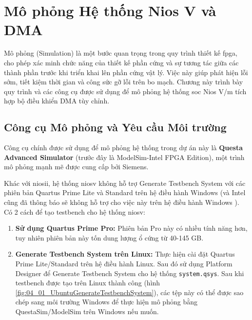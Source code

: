 \chapter{Mô phỏng Hệ thống Nios V và DMA}
\label{Chapter4}

Mô phỏng (Simulation) là một bước quan trọng trong quy trình thiết kế \acrshort{fpga}, cho phép xác minh chức năng của thiết kế phần cứng và sự tương tác giữa các thành phần trước khi triển khai lên phần cứng vật lý. Việc này giúp phát hiện lỗi sớm, tiết kiệm thời gian và công sức gỡ lỗi trên bo mạch. Chương này trình bày quy trình và các công cụ được sử dụng để mô phỏng hệ thống \acrshort{soc} Nios V/m tích hợp bộ điều khiển DMA tùy chỉnh.

\section{Công cụ Mô phỏng và Yêu cầu Môi trường}

Công cụ chính được sử dụng để mô phỏng hệ thống trong dự án này là \textbf{Questa Advanced Simulator} (trước đây là ModelSim-Intel FPGA Edition), một trình mô phỏng mạnh mẽ được cung cấp bởi Siemens.

Khác với \acrshort{niosii}, hệ thống \acrshort{niosv} không hỗ trợ Generate Testbench System với các phiên bản Quartus Prime Lite và Standard trên hệ điều hành Windows (và Intel cũng đã thông báo sẽ không hỗ trợ cho việc này trên hệ điều hành Windows \cite{intel-forum-simulation}). Có 2 cách để tạo testbench cho hệ thống \acrshort{niosv}:

\begin{enumerate}
    \item \textbf{Sử dụng Quartus Prime Pro:} Phiên bản Pro này có nhiều tính năng hơn, tuy nhiên phiên bản này tốn dung lượng ổ cứng từ 40-145 GB.
    \item \textbf{Generate Testbench System trên Linux:} Thực hiện cài đặt Quartus Prime Lite/Standard trên hệ điều hành Linux. Sau đó sử dụng Platform Designer để Generate Testbench System cho hệ thống \texttt{system.qsys}. Sau khi testbench được tạo trên Linux thành công (hình \ref{fig:04_01_UbuntuGenerateTestbenchSystem}), các tệp này có thể được sao chép sang môi trường Windows để thực hiện mô phỏng bằng QuestaSim/ModelSim trên Windows nếu muốn.
\end{enumerate}


